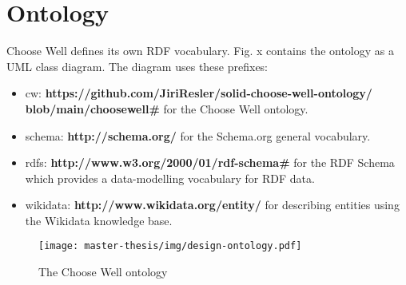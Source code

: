\section{Ontology}
Choose Well defines its own RDF vocabulary. 
Fig. x contains the ontology as a UML class diagram. 
The diagram uses these prefixes:

\begin{itemize}[noitemsep,nolistsep]
  \item cw: \textbf{https://github.com/JiriResler/solid-choose-well-ontology/} \newline \textbf{blob/main/choosewell\#} for the Choose Well ontology.
  \item schema: \textbf{http://schema.org/} for the Schema.org general vocabulary. 
  \item rdfs: \textbf{http://www.w3.org/2000/01/rdf-schema\#} for the RDF Schema which provides a data-modelling vocabulary for RDF data.
  \item wikidata: \textbf{http://www.wikidata.org/entity/} for describing entities using the Wikidata knowledge base.
\end{itemize}

\begin{figure}[h]
  \centering
  \texttt{[image: master-thesis/img/design-ontology.pdf]}
  \caption{The Choose Well ontology}
\end{figure}
